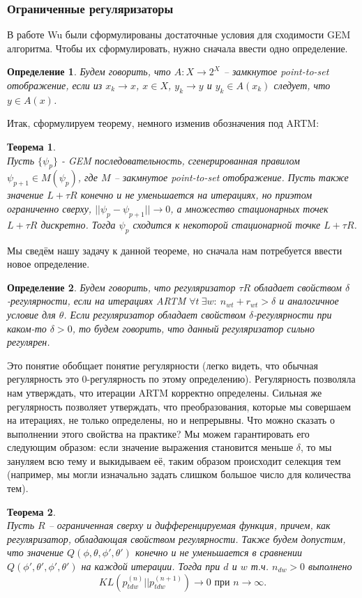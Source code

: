 \documentclass[12pt]{article}
\newtheorem{definition}{Определение}[section]
\newtheorem{theorem}{Теорема}
\begin{document}
	\subsubsection{Ограниченные регуляризаторы}
	 В работе Wu \cite{wuem} были сформулированы достаточные условия для сходимости GEM алгоритма. Чтобы их сформулировать, нужно сначала ввести одно определение.
	\begin{definition}
	Будем говорить, что $A\colon X \to 2^X$ -- замкнутое point-to-set отображение, если из $x_k \to x$, $x \in X$, $y_k \to y$ и $y_k \in A(x_k)$ следует, что $y \in A(x)$.
	\end{definition}
	Итак, сформулируем теорему, немного изменив обозначения под ARTM:
	\begin{theorem} \label{theorem_wu} \ \\
	Пусть $\{\psi_p\}$ - GEM последовательность, сгенерированная правилом $\psi_{p+1} \in M(\psi_p)$, где $M$ -- закмнутое point-to-set отображение. Пусть также значение $L + \tau R$ конечно и не уменьшается на итерациях, но приэтом ограниченно сверху, $|| \psi_p - \psi_{p+1}|| \to 0$, а множество стационарных точек $L + \tau R$ дискретно. Тогда $\psi_p$ сходится к некоторой стационарной точке $L + \tau R$.
	\end{theorem}
	Мы сведём нашу задачу к данной теореме, но сначала нам потребуется ввести новое определение.
	\begin{definition}
	Будем говорить, что регуляризатор $\tau R$ обладает свойством $\delta$-регулярности, если на итерациях ARTM $\forall t~\exists w \colon~n_{wt} + r_{wt} > \delta$ и аналогичное условие для $\theta$. Если регуляризатор  обладает свойством $\delta$-регулярности при каком-то $\delta > 0$, то будем говорить, что данный регуляризатор сильно регулярен.
	\end{definition}
	Это понятие обобщает понятие регулярности (легко видеть, что обычная регулярность это 0-регулярность по этому определению). Регулярность позволяла нам утверждать, что итерации ARTM корректно определены. Сильная же регулярность позволяет утверждать, что преобразования, которые мы совершаем на итерациях, не только определены, но и непрерывны. Что можно сказать о выполнении этого свойства на практике? Мы можем гарантировать его следующим образом: если значение выражения становится меньше $\delta$, то мы зануляем всю тему и выкидываем её, таким образом происходит селекция тем (например, мы могли изначально задать слишком большое число для количества тем).
	\begin{theorem} \label{theorem_neighbour_zero1} \ \\
	Пусть $R$ -- ограниченная сверху и дифференцируемая функция, причем, как регуляризатор, обладающая свойством регулярности. Также будем допустим,  что значение $Q(\phi, \theta, \phi', \theta')$ конечно и не уменьшается в сравнении $Q(\phi', \theta', \phi', \theta')$ на каждой итерации. Тогда при $d$ и $w$ т.ч. $n_{dw} > 0$ выполнено
\[
KL(p_{tdw}^{(n)}||p_{tdw}^{(n + 1)}) \to 0 \text{ при } n \to \infty.
\]
	\end{theorem}
\end{document}
